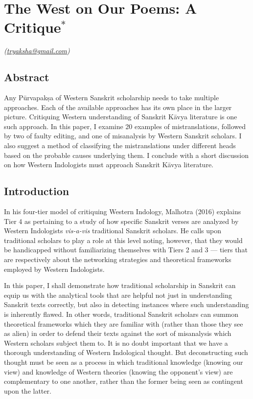\chapter[The West on Our Poems: A Critique]{The West on Our Poems: A Critique$^{*}$}\label{chapter\thechapter:begin}


\hfill{\sl(\url{tryaksha@gmail.com})}

\section*{Abstract} 

Any Pūrvapakṣa of Western Sanskrit scholarship needs to take multiple approaches. Each of the available approaches has its own place in the larger picture. Critiquing Western understanding of Sanskrit Kāvya literature is one such approach. In this paper, I examine 20 examples of mistranslations, followed by two of faulty editing, and one of misanalysis by Western Sanskrit scholars. I also suggest a method of classifying the mistranslations under different heads based on the probable causes underlying them. I conclude with a short discussion on how Western Indologists must approach Sanskrit Kāvya literature. 

\section*{Introduction}  

In his four-tier model of critiquing Western Indology, Malhotra (2016) explains Tier 4 as pertaining to a study of how specific Sanskrit verses are analyzed by Western Indologists \textsl{vis-a-vis} traditional Sanskrit scholars. He calls upon traditional scholars to play a role at this level noting, however, that they would be handicapped without familiarizing themselves with Tiers 2 and 3 --- tiers that are respectively about the networking strategies and theoretical frameworks employed by Western Indologists. 

In this paper, I shall demonstrate how traditional scholarship in Sanskrit can equip us with the analytical tools that are helpful not just in understanding Sanskrit texts correctly, but also in detecting instances where such understanding is inherently flawed. In other words, traditional Sanskrit scholars can summon theoretical frameworks which they are familiar with (rather than those they see as alien) in order to defend their texts against the sort of misanalysis which Western scholars subject them to. It is no doubt important that we have a thorough understanding of Western Indological thought. But deconstructing such thought must be seen as a process in which traditional knowledge (knowing our view) and knowledge of Western theories (knowing the opponent’s view) are complementary to one another, rather than the former being seen as contingent upon the latter. 

